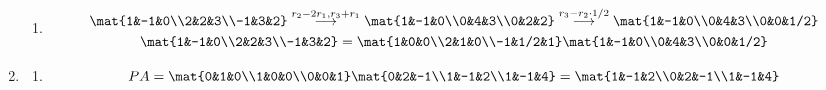 \documentclass{article}
\begin{document}
\begin{enumerate}
{\begin{enumerate}
{\begin{displaymath}
\begin{gathered}
                            \mat{1&0&0\\2&1&0\\1&0&1}
                            \mat{3&1&2\\0&1&0\\0&0&3}
                        \end{gathered}
                    \end{displaymath}
                }
                \item {
                    \begin{displaymath}
                        \begin{gathered}
                            \mat{1&-1&0\\2&2&3\\-1&3&2} \overset{r_2-2r_1, r_3+r_1}{\longrightarrow}
                            \mat{1&-1&0\\0&4&3\\0&2&2} \overset{r_3-r_2\cdot1/2}{\longrightarrow}
                            \mat{1&-1&0\\0&4&3\\0&0&1/2}
                            \\
                            \mat{1&-1&0\\2&2&3\\-1&3&2} =
                            \mat{1&0&0\\2&1&0\\-1&1/2&1}
                            \mat{1&-1&0\\0&4&3\\0&0&1/2}
                        \end{gathered}
                    \end{displaymath}
                }
            \end{enumerate}
        }
        \item {
            \begin{enumerate}
                \item {
                    \begin{displaymath}
                        PA =
                        \mat{0&1&0\\1&0&0\\0&0&1}
                        \mat{0&2&-1\\1&-1&2\\1&-1&4} =
                        \mat{1&-1&2\\0&2&-1\\1&-1&4}
                    \end{displaymath}
}
\end{enumerate}}
\end{enumerate}
\end{document}

